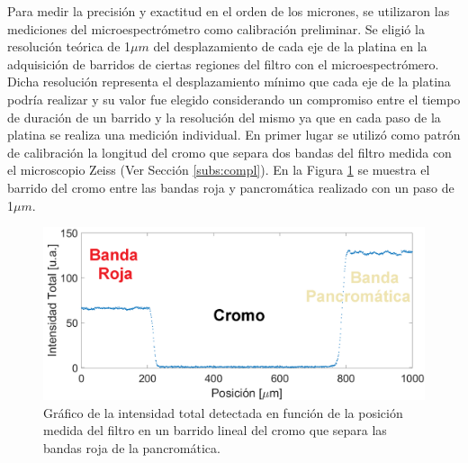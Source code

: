 Para medir la precisión y exactitud en el orden de los micrones, se utilizaron las mediciones del microespectrómetro como calibración preliminar. Se eligió la resolución teórica de 1$\mu m$ del desplazamiento de cada eje de la platina en la adquisición de barridos de ciertas regiones del filtro con el microespectrómero. Dicha resolución representa el desplazamiento mínimo que cada eje de la platina podría realizar y su valor fue elegido considerando un compromiso entre el tiempo de duración de un barrido y la resolución del mismo ya que en cada paso de la platina se realiza una medición individual.
En primer lugar se utilizó como patrón de calibración la longitud del cromo que separa dos bandas del filtro medida con el microscopio Zeiss (Ver Sección \ref{subs:compl}). En la Figura \ref{fig:barrcromoo} se muestra el barrido del cromo entre las bandas roja y pancromática realizado con un paso de 1$\mu m$.

\begin{figure}[H]
	\centering
	\includegraphics[width=1.0\columnwidth]{Figs/microespectrometro/barridocromocalib.png}
	\caption{Gráfico de la intensidad total detectada en función de la posición medida del filtro en un barrido lineal del cromo que separa las bandas roja de la pancromática.}
	\label{fig:barrcromoo}
\end{figure}

